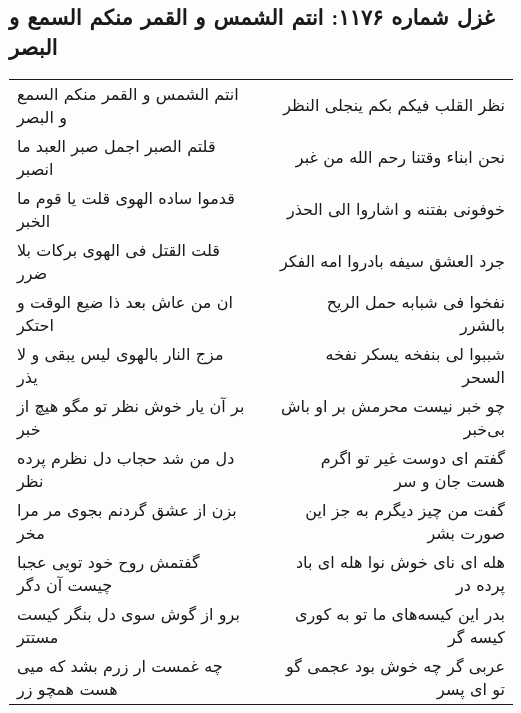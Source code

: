\begin{center}
\section*{غزل شماره ۱۱۷۶: انتم الشمس و القمر منکم السمع و البصر}
\label{sec:1176}
\begin{longtable}{l p{0.5cm} r}
انتم الشمس و القمر منکم السمع و البصر
&&
نظر القلب فیکم بکم ینجلی النظر
\\
قلتم الصبر اجمل صبر العبد ما انصبر
&&
نحن ابناء وقتنا رحم الله من غبر
\\
قدموا ساده الهوی قلت یا قوم ما الخبر
&&
خوفونی بفتنه و اشاروا الی الحذر
\\
قلت القتل فی الهوی برکات بلا ضرر
&&
جرد العشق سیفه بادروا امه الفکر
\\
ان من عاش بعد ذا ضیع الوقت و احتکر
&&
نفخوا فی شبابه حمل الریح بالشرر
\\
مزج النار بالهوی لیس یبقی و لا یذر
&&
شببوا لی بنفخه یسکر نفخه السحر
\\
بر آن یار خوش نظر تو مگو هیچ از خبر
&&
چو خبر نیست محرمش بر او باش بی‌خبر
\\
دل من شد حجاب دل نظرم پرده نظر
&&
گفتم ای دوست غیر تو اگرم هست جان و سر
\\
بزن از عشق گردنم بجوی مر مرا مخر
&&
گفت من چیز دیگرم به جز این صورت بشر
\\
گفتمش روح خود تویی عجبا چیست آن دگر
&&
هله ای نای خوش نوا هله ای باد پرده در
\\
برو از گوش سوی دل بنگر کیست مستتر
&&
بدر این کیسه‌های ما تو به کوری کیسه گر
\\
چه غمست ار زرم بشد که میی هست همچو زر
&&
عربی گر چه خوش بود عجمی گو تو ای پسر
\\
\end{longtable}
\end{center}
